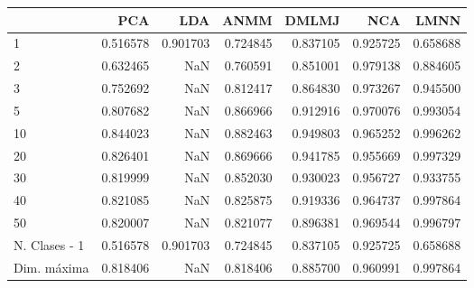 \begin{tabular}{lrrrrrr}
\toprule
{} &       PCA &       LDA &      ANMM &     DMLMJ &       NCA &      LMNN \\
\midrule
1             &  0.516578 &  0.901703 &  0.724845 &  0.837105 &  0.925725 &  0.658688 \\
2             &  0.632465 &       NaN &  0.760591 &  0.851001 &  0.979138 &  0.884605 \\
3             &  0.752692 &       NaN &  0.812417 &  0.864830 &  0.973267 &  0.945500 \\
5             &  0.807682 &       NaN &  0.866966 &  0.912916 &  0.970076 &  0.993054 \\
10            &  0.844023 &       NaN &  0.882463 &  0.949803 &  0.965252 &  0.996262 \\
20            &  0.826401 &       NaN &  0.869666 &  0.941785 &  0.955669 &  0.997329 \\
30            &  0.819999 &       NaN &  0.852030 &  0.930023 &  0.956727 &  0.933755 \\
40            &  0.821085 &       NaN &  0.825875 &  0.919336 &  0.964737 &  0.997864 \\
50            &  0.820007 &       NaN &  0.821077 &  0.896381 &  0.969544 &  0.996797 \\
N. Clases - 1 &  0.516578 &  0.901703 &  0.724845 &  0.837105 &  0.925725 &  0.658688 \\
Dim. máxima   &  0.818406 &       NaN &  0.818406 &  0.885700 &  0.960991 &  0.997864 \\
\bottomrule
\end{tabular}

